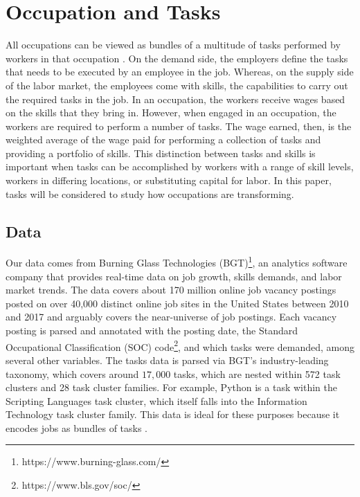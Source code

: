 \documentclass[letterpaper]{article} %
\begin{document}
\section{Occupation and Tasks}
\label{sec:data}
All occupations can be viewed as bundles of a multitude of tasks performed by workers in that occupation \cite{Acemoglu2018c}. On the demand side, the employers define the tasks that needs to be executed by an employee in the job. Whereas, on the supply side of the labor market, the employees come with skills, the capabilities to carry out the required tasks in the job. In an occupation, the workers receive wages based on the skills that they bring in. However, when engaged in an occupation, the workers are required to perform a number of tasks. The wage earned, then, is the weighted average of the wage paid for performing a collection of tasks and providing a portfolio of skills. This distinction between tasks and skills is important when tasks can be accomplished by workers with a range of skill levels, workers in differing locations, or substituting capital for labor. In this paper, tasks will be considered to study how occupations are transforming.

\subsection{Data}
\label{subsec:data} Our data comes from Burning Glass Technologies (BGT)\footnote{https://www.burning-glass.com/}, an analytics software company that provides real-time data on job growth, skills demands, and labor market trends. The data covers about 170 million online job vacancy postings posted on over 40,000 distinct online job sites in the United States between 2010 and 2017 and arguably covers the near-universe of job postings. Each vacancy posting is parsed and annotated with the posting date, the Standard Occupational Classification (SOC) code\footnote{https://www.bls.gov/soc/}, and which tasks were demanded, among several other variables. The tasks data is parsed via BGT's industry-leading taxonomy, which covers around $17,000$ tasks, which are nested within 572 task clusters and 28 task cluster families. For example, Python is a task within the Scripting Languages task cluster, which itself falls into the Information Technology task cluster family. This data is ideal for these purposes because it encodes jobs as bundles of tasks \cite{Deming2018}.
\end{document}
